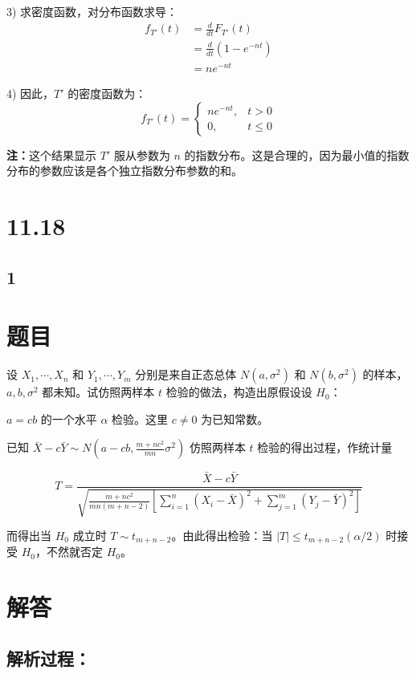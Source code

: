 \documentclass[UTF8]{report}
\theoremstyle{MyLineTheoremStyle} %
\theoremstyle{MyBlockTheoremStyle} %
\theoremstyle{MySubsubsectionStyle} %
\begin{document}
3) 求密度函数，对分布函数求导：
\begin{align*}
f_{T'}(t) &= \frac{d}{dt}F_{T'}(t) \\
&= \frac{d}{dt}(1 - e^{-nt}) \\
&= ne^{-nt}
\end{align*}

4) 因此，$T'$ 的密度函数为：
$$
f_{T'}(t) = \begin{cases}
ne^{-nt}, & t > 0 \\
0, & t \leq 0
\end{cases}
$$

\textbf{注：}这个结果显示 $T'$ 服从参数为 $n$ 的指数分布。这是合理的，因为最小值的指数分布的参数应该是各个独立指数分布参数的和。










\section{11.18}

\subsection{1}
\section*{题目}
设 $X_1,\cdots,X_n$ 和 $Y_1,\cdots,Y_m$ 分别是来自正态总体 $N(a,\sigma^2)$ 和 $N(b,\sigma^2)$ 的样本，$a,b,\sigma^2$ 都未知。试仿照两样本 $t$ 检验的做法，构造出原假设设 $H_0$：

$a = cb$ 的一个水平 $\alpha$ 检验。这里 $c\neq0$ 为已知常数。

已知 $\bar{X}-c\bar{Y} \sim N(a-cb, \frac{m+nc^2}{mn}\sigma^2)$ 仿照两样本 $t$ 检验的得出过程，作统计量

$$T = \frac{\bar{X}-c\bar{Y}}{\sqrt{\frac{m+nc^2}{mn(m+n-2)}[\sum_{i=1}^n(X_i-\bar{X})^2 + \sum_{j=1}^m(Y_j-\bar{Y})^2]}}$$

而得出当 $H_0$ 成立时 $T \sim t_{m+n-2}$。由此得出检验：当 $|T| \leq t_{m+n-2}(\alpha/2)$ 时接受 $H_0$，不然就否定 $H_0$。

\section*{解答}
\subsection*{解析过程：}
\end{document}
